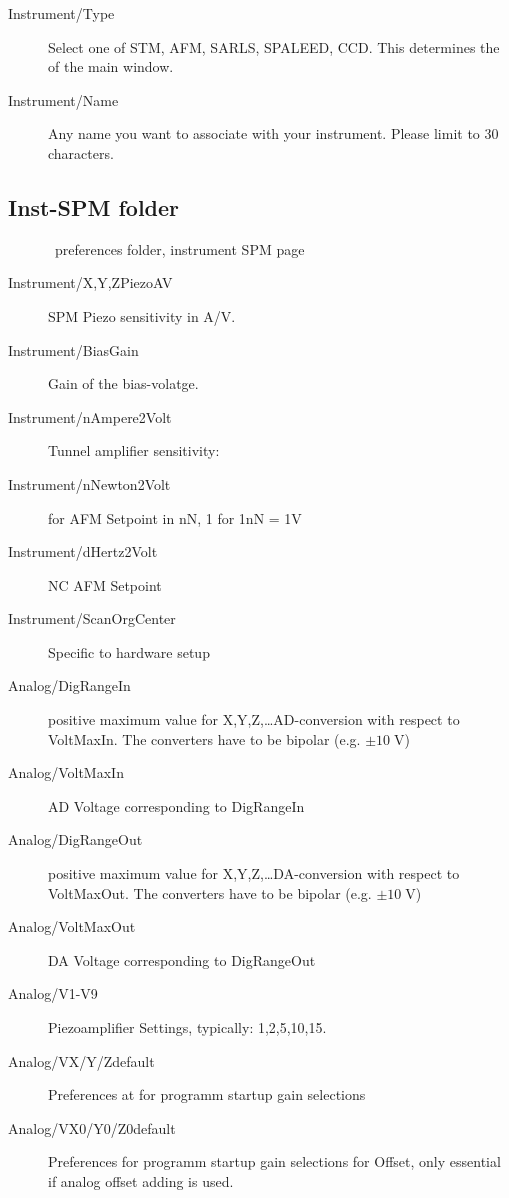 \begin{description}
\item[Instrument/Type] Select one of STM, AFM, SARLS, SPALEED, CCD.  This
determines the  of the main window.
\item[Instrument/Name] Any name you want to associate with your instrument. Please limit to 30 characters.
\end{description}

\clearpage
\subsection{Inst-SPM folder}

\begin{figure}[hbt]
\center {}
\caption{\Gxsm\ preferences folder, instrument SPM page}
\label{GxsmPrefInstrumentSPM}
\end{figure}

\begin{description}
\item[Instrument/X,Y,ZPiezoAV] SPM Piezo sensitivity in A/V.
\item[Instrument/BiasGain] Gain of the bias-volatge.
\item[Instrument/nAmpere2Volt] Tunnel amplifier sensitivity: 
\item[Instrument/nNewton2Volt] for AFM Setpoint in nN, 1 for 1nN = 1V
\item[Instrument/dHertz2Volt] NC AFM Setpoint
\item[Instrument/ScanOrgCenter] Specific to hardware setup%
\item[Analog/DigRangeIn] positive maximum value for X,Y,Z,\dots AD-conversion
  with respect to VoltMaxIn. The converters have to be bipolar
  (e.g. $\pm 10\;$V)%
\item[Analog/VoltMaxIn] AD Voltage corresponding to DigRangeIn%
 \item[Analog/DigRangeOut] positive maximum value for X,Y,Z,\dots DA-conversion
  with respect to VoltMaxOut. The converters have to be bipolar
  (e.g. $\pm 10\;$V)%
\item[Analog/VoltMaxOut] DA Voltage corresponding to DigRangeOut%
\item[Analog/V1-V9] Piezoamplifier Settings, typically:  1,2,5,10,15.
\item[Analog/VX/Y/Zdefault] Preferences at for programm startup gain selections
\item[Analog/VX0/Y0/Z0default] Preferences for programm startup gain selections for Offset, only essential if analog offset adding is used.
\end{description}

